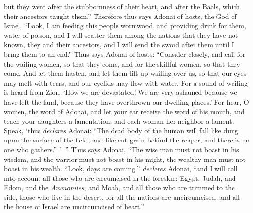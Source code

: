 \begin{biblechapter}
\verse but they went after the stubbornness of their heart, and after the Baals, which their ancestors taught them.”
\verse Therefore thus says Adonai of hosts, the God of Israel, “Look, I am feeding this people wormwood, and providing drink for them, water of poison,
\verse and I will scatter them among the nations that they have not known, they and their ancestors, and I will send the sword after them until I bring them to an end.”
\verse Thus says Adonai of hosts:
\verse “Consider closely, and call for the wailing women, so that they come, 
and for the skillful women, so that they come.
\verse And let them hasten, 
and let them lift up wailing over us, 
so that our eyes may melt with tears, 
and our eyelids may flow with water.
\verse For a sound of wailing is heard from Zion, 
‘How we are devastated! 
We are very ashamed because we have left the land, 
because they have overthrown our dwelling places.’
\verse For hear, O women, the word of Adonai, 
and let your ear receive the word of his mouth, 
and teach your daughters a lamentation, 
and each woman her neighbor a lament.
\verse Speak, ‘thus \textit{declares} Adonai: “The dead body of the human will fall 
like dung upon the surface of the field, 
and like cut grain behind the reaper, 
and there is no one who gathers.” ’ ”
 Thus says Adonai,
\verse “The wise man must not boast in his wisdom, 
and the warrior must not boast in his might, 
the wealthy man must not boast in his wealth.
 “Look, days are coming,” \textit{declares} Adonai, “and I will call into account all those who are circumcised in the foreskin:
\verse Egypt, Judah, and Edom, and the \textit{Ammonites}, and Moab, and all those who are trimmed to the side, those who live in the desert, for all the nations are uncircumcised, and all the house of Israel are uncircumcised of heart.”
\end{biblechapter}

